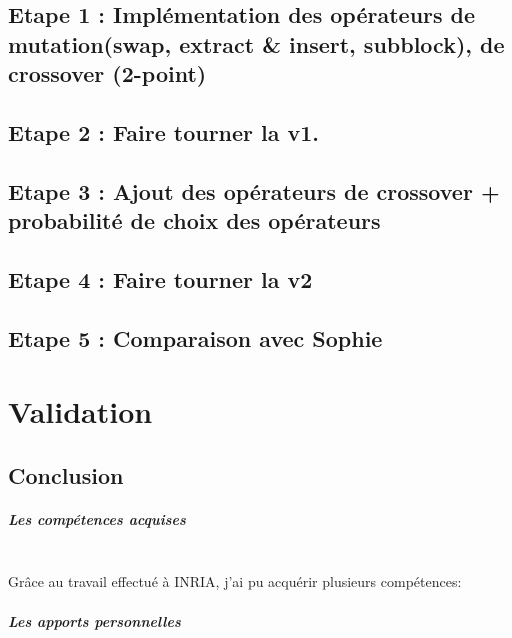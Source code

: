 \documentclass[a4paper,10pt]{report}
\begin{document}
    
    
   
    \section{Etape 1 : Implémentation des opérateurs de mutation(swap, extract & insert, subblock), de crossover (2-point)}
	
	
     \section{Etape 2 : Faire tourner la v1.}
    
	 
    \section{Etape 3 : Ajout des opérateurs de crossover + probabilité de choix des opérateurs }
 	
     
    \section{Etape 4 : Faire tourner la v2}
      
    
    \section{Etape 5 : Comparaison avec Sophie}
 	
     
	
  \chapter{Validation}

  \section*{Conclusion}
     
      \paragraph{Les compétences acquises}
	  ~\\
	  Grâce au travail effectué à INRIA, j'ai pu acquérir plusieurs compétences:
	  \begin{itemize}
	  \end{itemize}
      
      \paragraph{Les apports personnelles}
	~~\\
	
\end{document}

